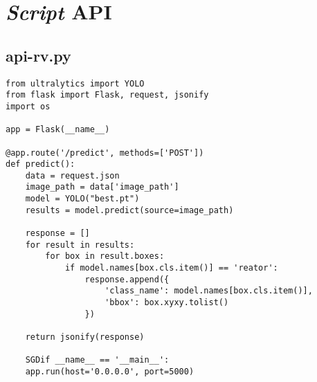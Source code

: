 
\chapter{\textit{Script} API}
\label{chap:script-api}

\section{api-rv.py}


\begin{lstlisting}
from ultralytics import YOLO
from flask import Flask, request, jsonify
import os

app = Flask(__name__)

@app.route('/predict', methods=['POST'])
def predict():
    data = request.json
    image_path = data['image_path']
    model = YOLO("best.pt")
    results = model.predict(source=image_path)

    response = []
    for result in results:
        for box in result.boxes:
            if model.names[box.cls.item()] == 'reator':
                response.append({
                    'class_name': model.names[box.cls.item()],
                    'bbox': box.xyxy.tolist()
                })

    return jsonify(response)

    SGDif __name__ == '__main__':
    app.run(host='0.0.0.0', port=5000)
\end{lstlisting}
